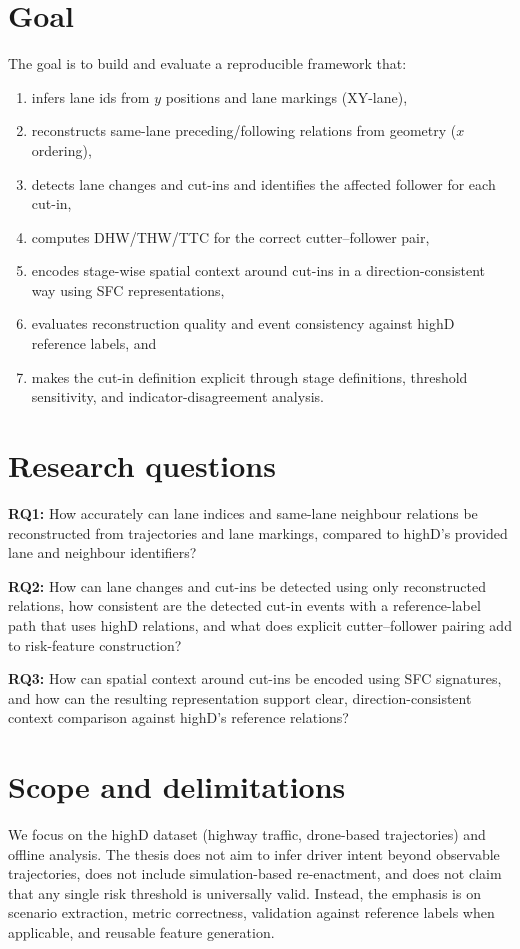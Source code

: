 \documentclass[12pt,a4paper,twoside,openright]{report}
\begin{document}
    \section{Goal}
    The goal is to build and evaluate a reproducible framework that:
    \begin{enumerate}[leftmargin=1.6em]
  \item infers lane ids from $y$ positions and lane markings (XY-lane),
  \item reconstructs same-lane preceding/following relations from geometry ($x$ ordering),
  \item detects lane changes and cut-ins and identifies the affected follower for each cut-in,
  \item computes DHW/THW/TTC for the correct cutter--follower pair,
  \item encodes stage-wise spatial context around cut-ins in a direction-consistent way using SFC representations,
  \item evaluates reconstruction quality and event consistency against highD reference labels, and
  \item makes the cut-in definition explicit through stage definitions, threshold sensitivity, and indicator-disagreement analysis.
    \end{enumerate}

    \section{Research questions}
    \textbf{RQ1:} How accurately can lane indices and same-lane neighbour relations be reconstructed from trajectories and lane markings, compared to highD's provided lane and neighbour identifiers?

    \textbf{RQ2:} How can lane changes and cut-ins be detected using only reconstructed relations, how consistent are the detected cut-in events with a reference-label path that uses highD relations, and what does explicit cutter--follower pairing add to risk-feature construction?

    \textbf{RQ3:} How can spatial context around cut-ins be encoded using SFC signatures, and how can the resulting representation support clear, direction-consistent context comparison against highD's reference relations?

    \section{Scope and delimitations}
    We focus on the highD dataset (highway traffic, drone-based trajectories) and offline analysis. The thesis does not aim to infer driver intent beyond observable trajectories, does not include simulation-based re-enactment, and does not claim that any single risk threshold is universally valid. Instead, the emphasis is on scenario extraction, metric correctness, validation against reference labels when applicable, and reusable feature generation.
\end{document}
